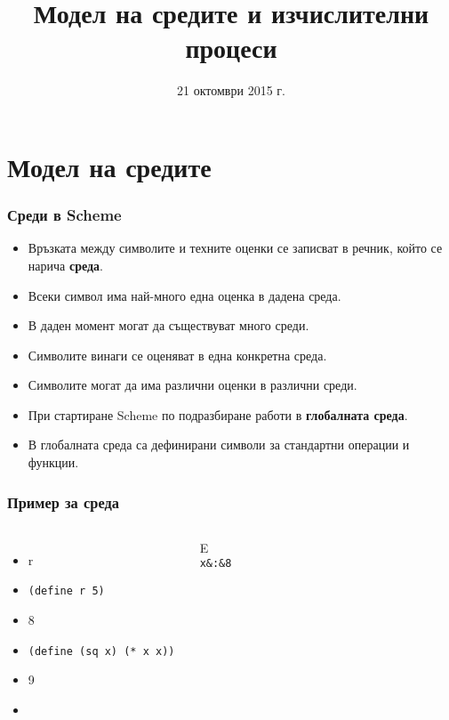 \documentclass{beamer}
\title[Среди и процеси]{Модел на средите и изчислителни процеси}
\date{21 октомври 2015 г.}
\begin{document}
\begin{frame}
  \titlepage
\end{frame}

\section{Модел на средите}

\begin{frame}
  \frametitle{Среди в Scheme}

  \begin{itemize}[<+->]
  \item Връзката между символите и техните оценки се записват в речник, който се нарича \textbf{среда}.
  \item Всеки символ има най-много една оценка в дадена среда.
  \item В даден момент могат да съществуват много среди.
  \item Символите винаги се оценяват в една конкретна среда.
  \item \alert{Символите могат да има различни оценки в различни среди.}
  \item При стартиране Scheme по подразбиране работи в \textbf{глобалната среда}.
  \item В глобалната среда са дефинирани символи за стандартни операции и функции.
  \end{itemize}
\end{frame}

\begin{frame}
  \frametitle{Пример за среда}

  \begin{columns}[t,onlytextwidth]
    {}

    \begin{itemize}[<+->]
    \item \evalstoerr r
    \item \tt{(define r 5)}
    \item {}8
    \item \tt{(define (sq x) (* x x))}
    \item {}9
    \item {}
    \end{itemize}

    {}

    \begin{envir}{E}
      \\\firstinenv \tt x&:&8
    \end{envir}
  \end{columns}
\end{frame}
\end{document}
